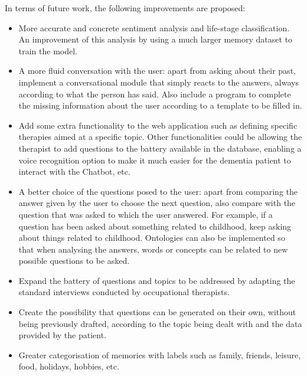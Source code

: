 In terms of future work, the following improvements are proposed:

\begin{itemize}
	\item More accurate and concrete sentiment analysis and life-stage classification. An improvement of this analysis by using a much larger memory dataset to train the model.
	\item A more fluid conversation with the user: apart from asking about their past, implement a conversational module that simply reacts to the answers, always according to what the person has said. Also include a program to complete the missing information about the user according to a template to be filled in.
	\item Add some extra functionality to the web application such as defining specific therapies aimed at a specific topic. Other functionalities could be allowing the therapist to add questions to the battery available in the database, enabling a voice recognition option to make it much easier for the dementia patient to interact with the Chatbot, etc.
	\item A better choice of the questions posed to the user: apart from comparing the answer given by the user to choose the next question, also compare with the question that was asked to which the user answered. For example, if a question has been asked about something related to childhood, keep asking about things related to childhood. Ontologies can also be implemented so that when analysing the answers, words or concepts can be related to new possible questions to be asked.
	\item Expand the battery of questions and topics to be addressed by adapting the standard interviews conducted by occupational therapists.
	\item Create the possibility that questions can be generated on their own, without being previously drafted, according to the topic being dealt with and the data provided by the patient.
	\item Greater categorisation of memories with labels such as family, friends, leisure, food, holidays, hobbies, etc.
\end{itemize}















